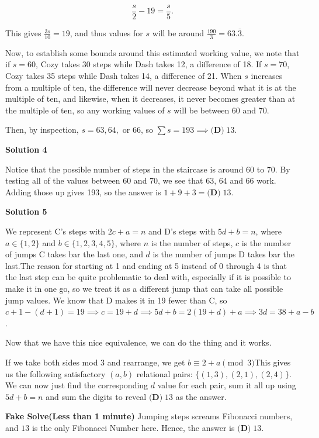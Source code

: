 \begin{enumerate}
 
 \[\frac{s}{2} - 19 = \frac{s}{5}.\]

 This gives $\frac{3s}{10} = 19$, and thus values for $s$ will be around $\frac{190}{3} = 63.\overline3$.

 Now, to establish some bounds around this estimated working value, we note that if $s=60$, Cozy takes 30 steps while Dash takes 12, a difference of 18.  If $s=70$, Cozy takes 35 steps while Dash takes 14, a difference of 21.  When $s$ increases from a multiple of ten, the difference will never decrease beyond what it is at the multiple of ten, and likewise, when it decreases, it never becomes greater than at the multiple of ten, so any working values of $s$ will be between $60$ and $70$.

 Then, by inspection, $s=63, 64,$ or $66$, so $\sum s = 193 \implies \boxed{\textbf{(D)}\; 13}.$




\textbf{Solution 4}

Notice that the possible number of steps in the staircase is around 60 to 70. By testing all of the values between 60 and 70, we see that 63, 64 and 66 work. Adding those up gives 193, so the answer is $1+9+3=\boxed{\textbf{(D)}\; 13}.$




\textbf{Solution 5}

We represent C's steps with $2c + a = n$ and D's steps with $5d + b = n$, where $a \in \{1,2\}$ and $b \in \{1,2,3,4,5\}$, where $n$ is the number of steps, $c$ is the number of jumps C takes bar the last one, and $d$ is the number of jumps D takes bar the last.The reason for starting at 1 and ending at 5 instead of 0 through 4 is that the last step can be quite problematic to deal with, especially if it is possible to make it in one go, so we treat it as a different jump that can take all possible jump values. We know that D makes it in 19 fewer than C, so $c+1-(d+1) = 19 \implies c = 19+d \implies 5d + b = 2(19+d) + a \implies 3d = 38 + a - b$.

 Now that we have this nice equivalence, we can do the thing and it works. 

 If we take both sides mod 3 and rearrange, we get $b \equiv 2+a \pmod{3}$This gives us the following satisfactory $(a,b)$ relational pairs: $\{(1,3),(2,1),(2,4)\}$. We can now just find the corresponding $d$ value for each pair, sum it all up using $5d + b = n$ and sum the digits to reveal $\boxed{\textbf{(D)}\; 13}$ as the answer.

 \textbf{Fake Solve(Less than 1 minute)} Jumping steps screams Fibonacci numbers, and $13$ is the only Fibonacci Number here. Hence, the answer is $\boxed{\textbf{(D)}\; 13}$.


\end{enumerate}
